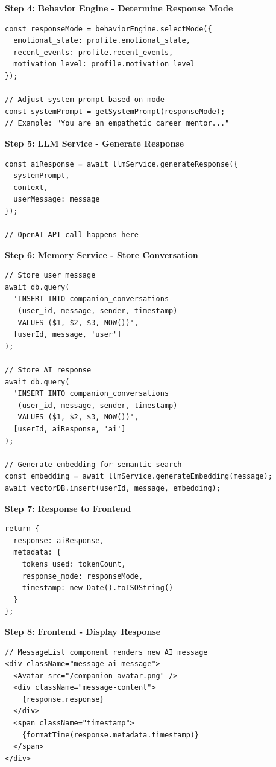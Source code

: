 \documentclass[12pt,a4paper]{article}
\begin{document}
\textbf{Step 4: Behavior Engine - Determine Response Mode}

\begin{verbatim}
const responseMode = behaviorEngine.selectMode({
  emotional_state: profile.emotional_state,
  recent_events: profile.recent_events,
  motivation_level: profile.motivation_level
});

// Adjust system prompt based on mode
const systemPrompt = getSystemPrompt(responseMode);
// Example: "You are an empathetic career mentor..."
\end{verbatim}

\textbf{Step 5: LLM Service - Generate Response}

\begin{verbatim}
const aiResponse = await llmService.generateResponse({
  systemPrompt,
  context,
  userMessage: message
});

// OpenAI API call happens here
\end{verbatim}

\textbf{Step 6: Memory Service - Store Conversation}

\begin{verbatim}
// Store user message
await db.query(
  'INSERT INTO companion_conversations 
   (user_id, message, sender, timestamp) 
   VALUES ($1, $2, $3, NOW())',
  [userId, message, 'user']
);

// Store AI response
await db.query(
  'INSERT INTO companion_conversations 
   (user_id, message, sender, timestamp) 
   VALUES ($1, $2, $3, NOW())',
  [userId, aiResponse, 'ai']
);

// Generate embedding for semantic search
const embedding = await llmService.generateEmbedding(message);
await vectorDB.insert(userId, message, embedding);
\end{verbatim}

\textbf{Step 7: Response to Frontend}

\begin{verbatim}
return {
  response: aiResponse,
  metadata: {
    tokens_used: tokenCount,
    response_mode: responseMode,
    timestamp: new Date().toISOString()
  }
};
\end{verbatim}

\textbf{Step 8: Frontend - Display Response}

\begin{verbatim}
// MessageList component renders new AI message
<div className="message ai-message">
  <Avatar src="/companion-avatar.png" />
  <div className="message-content">
    {response.response}
  </div>
  <span className="timestamp">
    {formatTime(response.metadata.timestamp)}
  </span>
</div>
\end{verbatim}
\end{document}
